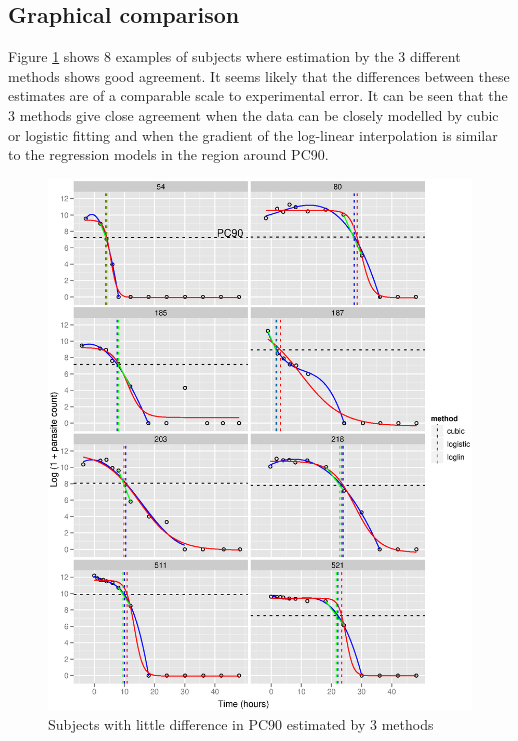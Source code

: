 \subsection{Graphical comparison}
Figure \ref{pc90-agree} shows 8 examples of subjects where estimation by the 3 different methods shows good agreement. It seems likely that the differences between these estimates are of a comparable scale to experimental error. It can be seen that the 3 methods give close agreement when the data can be closely modelled by cubic or logistic fitting and when the gradient of the log-linear interpolation is similar to the regression models in the region around PC90. 
\begin{figure}[h]
\includegraphics[width=150mm]{pc90-agree.eps} 
\caption{Subjects with little difference in PC90 estimated by 3 methods}
\label{pc90-agree}
\end{figure}

